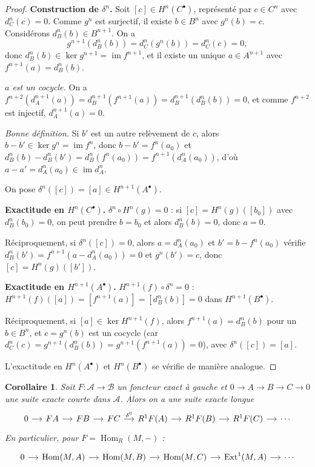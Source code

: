 \documentclass[a4paper,12pt]{book}
\DeclareMathOperator{\Hom}{Hom}
\DeclareMathOperator{\im}{im}
\newtheorem{corollaire}[theoreme]{Corollaire}
\begin{document}
\begin{proof}
\textbf{Construction de $\delta^n$.}
Soit $[c] \in H^n(C^\bullet)$, représenté par $c \in C^n$ avec
$d_C^n(c) = 0$. Comme $g^n$ est surjectif, il existe $b \in B^n$
avec $g^n(b) = c$. Considérons $d_B^n(b) \in B^{n+1}$.
On a
\[
  g^{n+1}(d_B^n(b)) = d_C^n(g^n(b)) = d_C^n(c) = 0,
\]
donc $d_B^n(b) \in \ker g^{n+1} = \im f^{n+1}$, et il existe un unique
$a \in A^{n+1}$ avec $f^{n+1}(a) = d_B^n(b)$.

\emph{$a$ est un cocycle.} On a $f^{n+2}(d_A^{n+1}(a)) = d_B^{n+1}(f^{n+1}(a))
= d_B^{n+1}(d_B^n(b)) = 0$, et comme $f^{n+2}$ est injectif,
$d_A^{n+1}(a) = 0$.

\emph{Bonne définition.} Si $b'$ est un autre relèvement de $c$, alors
$b - b' \in \ker g^n = \im f^n$, donc $b - b' = f^n(a_0)$ et
$d_B^n(b) - d_B^n(b') = d_B^n(f^n(a_0)) = f^{n+1}(d_A^n(a_0))$,
d'où $a - a' = d_A^n(a_0) \in \im d_A^n$.

On pose $\delta^n([c]) = [a] \in H^{n+1}(A^\bullet)$.

\medskip
\textbf{Exactitude en $H^n(C^\bullet)$.}
$\delta^n \circ H^n(g) = 0$ : si $[c] = H^n(g)([b_0])$ avec $d_B^n(b_0) = 0$,
on peut prendre $b = b_0$ et alors $d_B^n(b) = 0$, donc $a = 0$.

Réciproquement, si $\delta^n([c]) = 0$, alors $a = d_A^n(a_0)$ et
$b' = b - f^n(a_0)$ vérifie $d_B^n(b') = f^{n+1}(a - d_A^n(a_0)) = 0$ et
$g^n(b') = c$, donc $[c] = H^n(g)([b'])$.

\medskip
\textbf{Exactitude en $H^{n+1}(A^\bullet)$.}
$H^{n+1}(f) \circ \delta^n = 0$ : $H^{n+1}(f)([a]) = [f^{n+1}(a)]
= [d_B^n(b)] = 0$ dans $H^{n+1}(B^\bullet)$.

Réciproquement, si $[a] \in \ker H^{n+1}(f)$, alors $f^{n+1}(a) = d_B^n(b)$
pour un $b \in B^n$, et $c = g^n(b)$ est un cocycle (car
$d_C^n(c) = g^{n+1}(d_B^n(b)) = g^{n+1}(f^{n+1}(a)) = 0$), avec
$\delta^n([c]) = [a]$.

L'exactitude en $H^n(A^\bullet)$ et $H^n(B^\bullet)$ se vérifie de manière
analogue.
\end{proof}

\begin{corollaire}\label{cor:long-exact-derived}
Soit $F \colon \mathcal{A} \to \mathcal{B}$ un foncteur exact à gauche
et $0 \to A \to B \to C \to 0$ une suite exacte courte dans $\mathcal{A}$.
Alors on a une suite exacte longue
\[
\begin{tikzcd}[column sep=small]
0 \arrow[r]
& FA \arrow[r]
& FB \arrow[r]
& FC \arrow[r, "\delta^0"]
& R^1 F(A) \arrow[r]
& R^1 F(B) \arrow[r]
& R^1 F(C) \arrow[r]
& \cdots
\end{tikzcd}
\]
En particulier, pour $F = \Hom_R(M, -)$ :
\[
\begin{tikzcd}[column sep=small]
0 \arrow[r]
& \Hom(M, A) \arrow[r]
& \Hom(M, B) \arrow[r]
& \Hom(M, C) \arrow[r]
& \operatorname{Ext}^1(M, A) \arrow[r]
& \cdots
\end{tikzcd}
\]
\end{corollaire}
\end{document}
